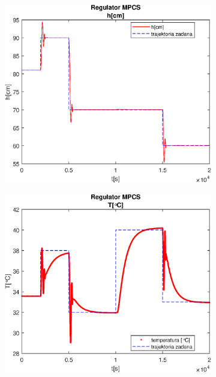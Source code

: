 \begin{figure}[h!]
   \centering
   \begin{subfigure}[b]{0.4\textwidth}
      \includegraphics[width=1\linewidth]{img/MPCSanaRK/MPCSRKHN100Nu10l10.eps}
      \caption{}
      \label{fig:fig:MPCSRKN100Nu10l101}
   \end{subfigure}
       
   \begin{subfigure}[b]{0.4\textwidth}
      \includegraphics[width=1\linewidth]{img/MPCSanaRK/MPCSRKTN100Nu10l10.eps}
      \caption{}
      \label{fig:fig:MPCSRKN100Nu10l102}
   \end{subfigure}
       

\end{figure}
